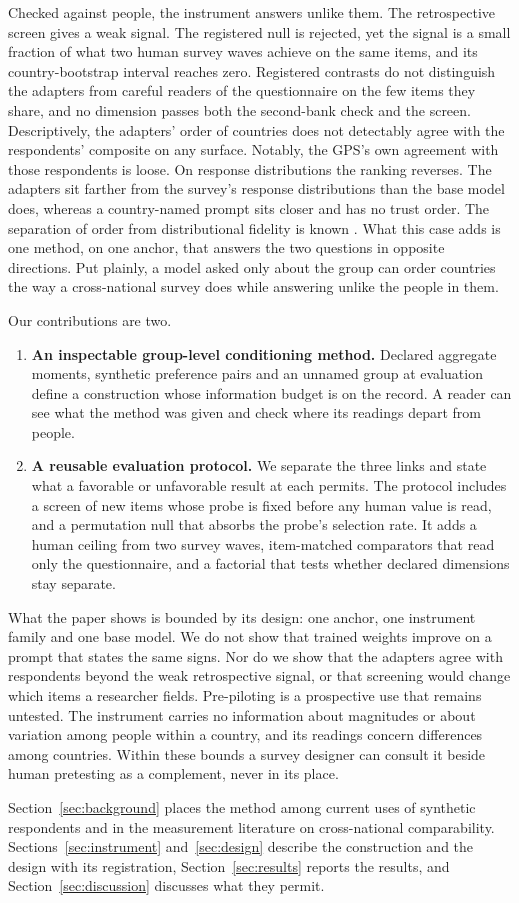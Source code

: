 Checked against people, the instrument answers unlike them. The retrospective screen gives a weak signal. The registered null is rejected, yet the signal is a small fraction of what two human survey waves achieve on the same items, and its country-bootstrap interval reaches zero. Registered contrasts do not distinguish the adapters from careful readers of the questionnaire on the few items they share, and no dimension passes both the second-bank check and the screen. Descriptively, the adapters' order of countries does not detectably agree with the respondents' composite on any surface. Notably, the GPS's own agreement with those respondents is loose. On response distributions the ranking reverses. The adapters sit farther from the survey's response distributions than the base model does, whereas a country-named prompt sits closer and has no trust order. The separation of order from distributional fidelity is known \citep{dasilva2026,wangc2026}. What this case adds is one method, on one anchor, that answers the two questions in opposite directions. Put plainly, a model asked only about the group can order countries the way a cross-national survey does while answering unlike the people in them.

Our contributions are two.
\begin{enumerate}
\item \textbf{An inspectable group-level conditioning method.} Declared aggregate moments, synthetic preference pairs and an unnamed group at evaluation define a construction whose information budget is on the record. A reader can see what the method was given and check where its readings depart from people.
\item \textbf{A reusable evaluation protocol.} We separate the three links and state what a favorable or unfavorable result at each permits. The protocol includes a screen of new items whose probe is fixed before any human value is read, and a permutation null that absorbs the probe's selection rate. It adds a human ceiling from two survey waves, item-matched comparators that read only the questionnaire, and a factorial that tests whether declared dimensions stay separate.
\end{enumerate}

What the paper shows is bounded by its design: one anchor, one instrument family and one base model. We do not show that trained weights improve on a prompt that states the same signs. Nor do we show that the adapters agree with respondents beyond the weak retrospective signal, or that screening would change which items a researcher fields. Pre-piloting is a prospective use that remains untested. The instrument carries no information about magnitudes or about variation among people within a country, and its readings concern differences among countries. Within these bounds a survey designer can consult it beside human pretesting as a complement, never in its place.

Section~\ref{sec:background} places the method among current uses of synthetic respondents and in the measurement literature on cross-national comparability. Sections~\ref{sec:instrument} and~\ref{sec:design} describe the construction and the design with its registration, Section~\ref{sec:results} reports the results, and Section~\ref{sec:discussion} discusses what they permit.
